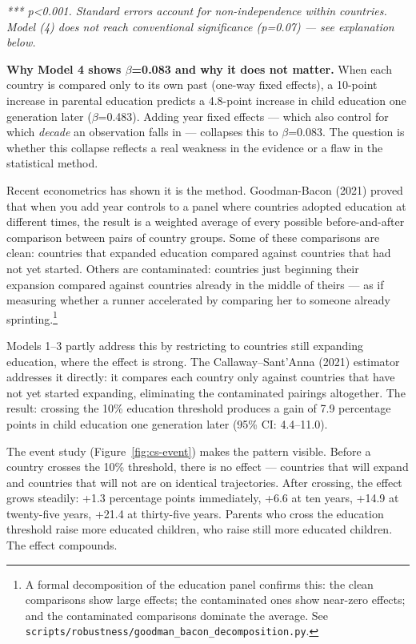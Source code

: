 \documentclass[12pt,letterpaper]{article}
\begin{document}
{\emph{*** p\textless0.001. Standard errors account for non-independence
within countries. Model (4) does not reach conventional significance
(p=0.07) --- see explanation below.}

\textbf{Why Model 4 shows $\beta$=0.083 and why it does not matter.}
When each country is compared only to its own past (one-way fixed
effects), a 10-point increase in parental education predicts a 4.8-point
increase in child education one generation later ($\beta$=0.483). Adding
year fixed effects --- which also control for which \emph{decade} an
observation falls in --- collapses this to $\beta$=0.083. The question
is whether this collapse reflects a real weakness in the evidence or a
flaw in the statistical method.

Recent econometrics has shown it is the method. Goodman-Bacon (2021)
proved that when you add year controls to a panel where countries adopted
education at different times, the result is a weighted average of every
possible before-and-after comparison between pairs of country groups.
Some of these comparisons are clean: countries that expanded education
compared against countries that had not yet started. Others are
contaminated: countries just beginning their expansion compared against
countries already in the middle of theirs --- as if measuring whether a
runner accelerated by comparing her to someone already
sprinting.\footnote{A formal decomposition of the education panel
confirms this: the clean comparisons show large effects; the contaminated
ones show near-zero effects; and the contaminated comparisons dominate
the average. See
\texttt{scripts/robustness/goodman\_bacon\_decomposition.py}.}

Models 1--3 partly address this by restricting to countries still
expanding education, where the effect is strong. The
Callaway--Sant'Anna (2021) estimator addresses it directly: it compares
each country only against countries that have not yet started expanding,
eliminating the contaminated pairings altogether. The result: crossing
the 10\% education threshold produces a gain of 7.9 percentage points in
child education one generation later (95\% CI: 4.4--11.0).

The event study (Figure~\ref{fig:cs-event}) makes the pattern visible.
Before a country crosses the 10\% threshold, there is no effect ---
countries that will expand and countries that will not are on identical
trajectories. After crossing, the effect grows steadily: +1.3 percentage
points immediately, +6.6 at ten years, +14.9 at twenty-five years,
+21.4 at thirty-five years. Parents who cross the education threshold
raise more educated children, who raise still more educated children.
The effect compounds.

}
\end{document}

